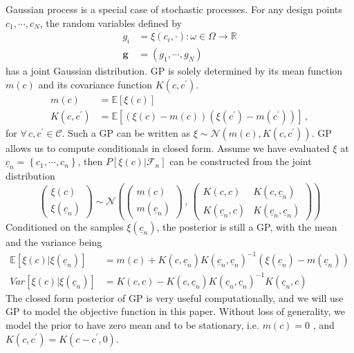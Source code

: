 \documentclass[a4paper,onecolumn]{article}
\theoremstyle{remark}
\begin{document}
Gaussian process is a special case of stochastic processes. For any design 
points $c_1, \cdots, c_N$, the random variables defined by
\begin{equation}\begin{split}
   g_i&=\xi(c_i, \cdot): \omega \in \Omega \rightarrow \mathbb{R}\\
   \mathbf{g} &= (g_1, \cdots, g_N)
\end{split}\end{equation}
has a joint Gaussian distribution. GP is solely determined by its mean 
function $m(c)$ and its covariance function $K(c,c^\prime)$. 
\begin{equation}\begin{split}
    m(c) &= \mathbb{E}[\xi(c)]\\
    K(c, c^\prime) &= \mathbb{E}[(\xi(c)-m(c))(\xi(c^\prime)-m(c^\prime))]\,,
\end{split}\end{equation}
for $\forall\, c, c^\prime \in \mathcal{C}$.
Such a GP can be written as
$\xi \sim\mathcal{N}(m(c), K(c,c^\prime))$.
GP allows us to compute conditionals in closed form. 
Assume we have evaluated $\xi$ at $\underline{c}_n=\left\{c_1, \cdots, c_n\right\}$, then 
$P[\xi(c)|\mathcal{F}_n]$ can be constructed from the joint distribution
\begin{equation}
    \begin{pmatrix}
        \xi(c)\\ \xi(\underline{c}_n)
    \end{pmatrix} \sim
    \mathcal{N}\left( 
        \begin{pmatrix}
            m(c)\\
            m(\underline{c}_n)
        \end{pmatrix} \,,\,
        \begin{pmatrix}
            K(c,c) & K(c, \underline{c}_n)\\
            K(\underline{c}_n, c) & K(\underline{c}_n,\underline{c}_n)
        \end{pmatrix}
    \right)
\end{equation}
Conditioned on the samples $\xi(\underline{c}_n)$, the posterior is still a
GP, with the mean and the variance being
\begin{equation}\begin{split}
    \mathbb{E}\left[\left. \xi(c)\right| \xi(\underline{c}_n)\right] & 
    = m(c) + K(c,\underline{c}_n)K(\underline{c}_n,\underline{c}_n)^{-1}
    \left(\xi(\underline{c}_n) - m(\underline{c}_n)\right)\\
    Var\left[\left. \xi(c)\right| \xi(\underline{c}_n) \right] &=
    K(c,c) - K(c,\underline{c}_n) K(\underline{c}_n, \underline{c}_n)^{-1} K(\underline{c}_n,c)
\end{split}\end{equation}
The closed form posterior of GP is very useful computationally, and we will use GP to model the 
objective function in this paper.
Without loss of generality, we model the prior to have zero mean and to be 
stationary, i.e.
$m(c)=0$ , and $K(c,c^\prime) = K(c-c^\prime, 0)$.\\
\end{document}
